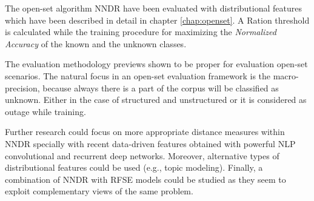 The open-set algorithm NNDR have been evaluated with distributional features which have been described in detail in chapter \ref{chap:openset}. A \textDistance Ration threshold is calculated while the training procedure for maximizing the \textit{Normalized Accuracy} of the known and the unknown classes.

The evaluation methodology previews shown to be proper for evaluation open-set scenarios. The natural focus in an open-set evaluation framework is the macro-precision, because always there is a part of the corpus will be classified as unknown. Either in the case of structured and unstructured or it is considered as outage while training.

Further research could focus on more appropriate distance measures within NNDR specially with recent data-driven features obtained with powerful NLP convolutional and recurrent deep networks. Moreover, alternative types of distributional features could be used (e.g., topic modeling). Finally, a combination of NNDR with RFSE models could be studied as they seem to exploit complementary views of the same problem.